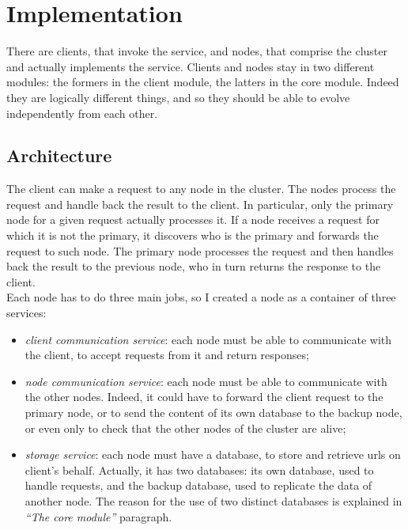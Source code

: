 \documentclass{article}
\begin{document}
\section{Implementation}  
There are clients, that invoke the service, and nodes, that comprise the cluster and actually implements the service. Clients and nodes stay in two different modules: the formers in the client module, the latters in the core module. Indeed they are logically different things, and so they should be able to evolve independently from each other. 

\subsection{Architecture} 

The client can make a request to any node in the cluster. The nodes process the request and handle back the result to the client.  In particular, only the primary node for a given request actually processes it. If a node receives a request for which it is not the primary, it discovers who is the primary and forwards the request to such node. The primary node processes the request and then handles back the result to the previous node, who in turn returns the response to the client. \\
Each node has to do three main jobs, so I created a node as a container of three services: 
\begin{itemize}
\item \textit{client communication service}: each node must be able to communicate with the client, to accept requests from it and return responses;
\item \textit{node communication service}: each node must be able to communicate with the other nodes. Indeed, it could have to forward the client request to the primary node, or to send the content of its own database to the backup node, or even only to check that the other nodes of the cluster are alive;
\item \textit{storage service}: each node must have a database, to store and retrieve urls on client's behalf. Actually, it has two databases: its own database, used to handle requests, and the backup database, used to replicate the data of another node. The reason for the use of two distinct databases is explained in \textit{``The core module''} paragraph. 
\end{itemize}
\end{document}
